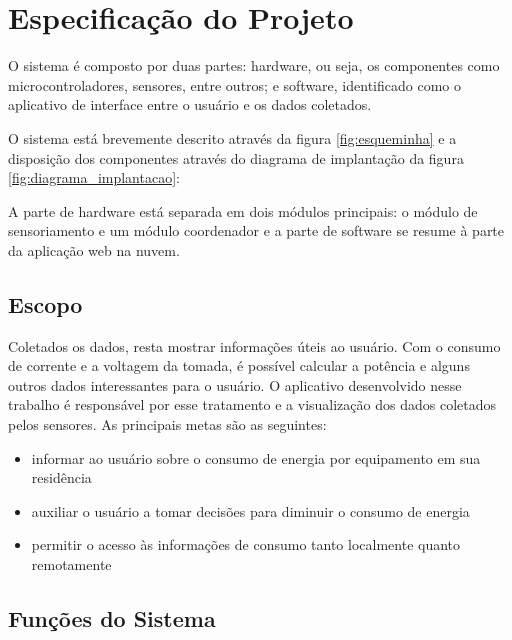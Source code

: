 \chapter{Especificação do Projeto}
\label{Cap:especificacao}

O sistema é composto por duas partes: hardware, ou seja, os componentes como microcontroladores, sensores, entre outros; e software, identificado como o aplicativo de interface entre o usuário e os dados coletados.

O sistema está brevemente descrito através da figura \ref{fig:esqueminha} e a disposição dos componentes através do diagrama de implantação da figura \ref{fig:diagrama_implantacao}:

A parte de hardware está separada em dois módulos principais: o módulo de sensoriamento e um módulo coordenador e a parte de software se resume à parte da aplicação web na nuvem.



\section{Escopo}

Coletados os dados, resta mostrar informações úteis ao usuário. Com o consumo de corrente e a voltagem da tomada, é possível calcular a potência e alguns outros dados interessantes para o usuário. O aplicativo desenvolvido nesse trabalho é responsável por esse tratamento e a visualização dos dados coletados pelos sensores. As principais metas são as seguintes:

\begin{itemize}
	\item{informar ao usuário sobre o consumo de energia por equipamento em sua residência}
	\item{auxiliar o usuário a tomar decisões para diminuir o consumo de energia}
  \item{permitir o acesso às informações de consumo tanto localmente quanto remotamente}
\end{itemize}
%
\section{Funções do Sistema}

